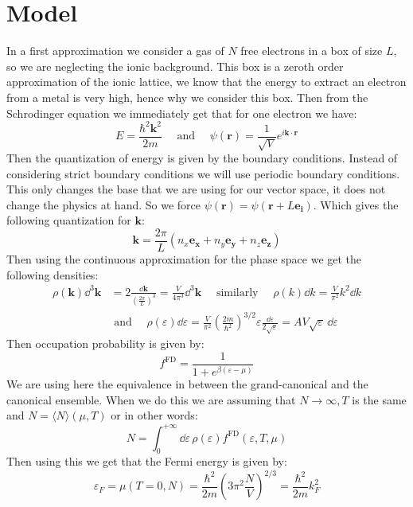 \documentclass[10pt,a4paper]{book}
\begin{document}
\section{Model}
In a first approximation we consider a gas of $N$ free electrons in a box of size $L$, so we are neglecting the ionic background. This box is a zeroth order approximation of the ionic lattice, we know that the energy to extract an electron from a metal is very high, hence why we consider this box. Then from the Schrodinger equation we immediately get that for one electron we have:
\[
E = \frac{\hbar^2 \mathbf{k}^2}{2m} \quad \text{ and } \quad \psi(\mathbf{r}) = \frac{1}{\sqrt{V}} e^{i \mathbf{k} \cdot \mathbf{r}}
\]
Then the quantization of energy is given by the boundary conditions. Instead of considering strict boundary conditions we will use periodic boundary conditions. This only changes the base that we are using for our vector space, it does not change the physics at hand. So we force $\psi(\mathbf{r}) = \psi(\mathbf{r} + L \mathbf{e_i})$. Which gives the following quantization for $\mathbf{k}$:
\[
\mathbf{k} = \frac{2\pi}{L}(n_x \mathbf{e_x} + n_y \mathbf{e_y} + n_z \mathbf{e_z})
\]
Then using the continuous approximation for the phase space we get the following densities:
\begin{align*}
\rho(\mathbf{k}) \dd^3 \mathbf{k} &= 2 \frac{\dd \mathbf{k}}{\left(\frac{2 \pi}{L}\right)^3} = \frac{V}{4 \pi^3} \dd^3 \mathbf{k} \quad \text{ similarly } \quad \rho(k) \dd k = \frac{V}{\pi^2} k^2 \dd k \\
&\text{ and } \quad \rho(\varepsilon) \dd \varepsilon = \frac{V}{\pi^2} \left(\frac{2m}{\hbar^2}\right)^{3/2} \varepsilon \frac{\dd \varepsilon}{2 \sqrt{\varepsilon}} = A V \sqrt{\varepsilon} \,\dd \varepsilon
\end{align*}
Then occupation probability is given by:
\[
f^\text{FD} = \frac{1}{1 + e^{\beta(\varepsilon - \mu)}}
\]
We are using here the equivalence in between the grand-canonical and the canonical ensemble. When we do this we are assuming that $N \to \infty, T$ is the same and $N = \langle N \rangle (\mu, T)$ or in other words:
\[
N = \int_0^{+\infty} \dd\varepsilon \, \rho(\varepsilon) f^\text{FD}(\varepsilon, T, \mu) 
\]
Then using this we get that the Fermi energy is given by:
\[
\varepsilon_F = \mu(T = 0, N) = \frac{\hbar^2}{2m} \left( 3 \pi^2 \frac{N}{V}\right)^{2/3} = \frac{\hbar^2}{2m} k_F^2
\]
\end{document}
